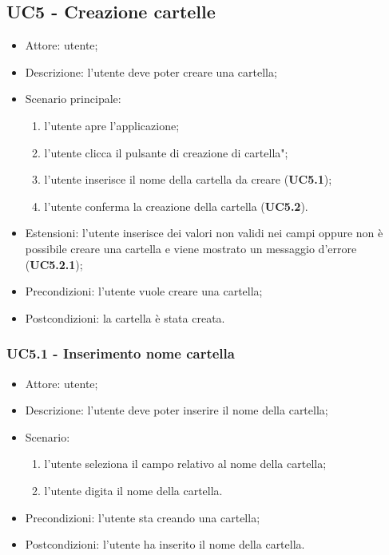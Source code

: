 
    \subsection{UC5 - Creazione cartelle}
    \begin{itemize}
        \item Attore: utente;
        \item Descrizione: l'utente deve poter creare una cartella;
        \item Scenario principale:
            \begin{enumerate}
            \item l’utente apre l’applicazione;
            \item l’utente clicca il pulsante di creazione di cartella";
            \item l'utente inserisce il nome della cartella da creare (\textbf{UC5.1});
            \item l'utente conferma la creazione della cartella (\textbf{UC5.2}).            
            \end{enumerate}
        \item Estensioni: l'utente inserisce dei valori non validi nei campi oppure non è possibile creare una cartella e viene mostrato un messaggio d'errore (\textbf{UC5.2.1});
        \item Precondizioni: l'utente vuole creare una cartella;
        \item Postcondizioni: la cartella è stata creata.
    \end{itemize}

    \subsubsection{UC5.1 - Inserimento nome cartella}
    \begin{itemize}
        \item Attore: utente;
        \item Descrizione: l'utente deve poter inserire il nome della cartella;
        \item Scenario:
        \begin{enumerate}
        \item l'utente seleziona il campo relativo al nome della cartella;
        \item l'utente digita il nome della cartella.
        \end{enumerate}
        \item Precondizioni: l'utente sta creando una cartella;
        \item Postcondizioni: l'utente ha inserito il nome della cartella.
    \end{itemize}
